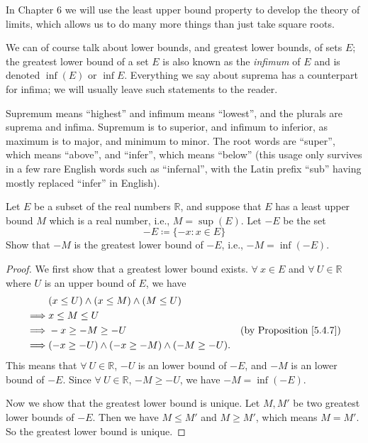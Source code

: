\begin{remark}\label{5.5.14}
In Chapter 6 we will use the least upper bound property to develop the theory of limits, which allows us to do many more things than just take square roots.
\end{remark}

\begin{remark}\label{5.5.15}
We can of course talk about lower bounds, and greatest lower bounds, of sets \(E\);
the greatest lower bound of a set \(E\) is also known as the \emph{infimum} of \(E\) and is denoted \(\inf(E)\) or \(\inf E\).
Everything we say about suprema has a counterpart for infima;
we will usually leave such statements to the reader.
\end{remark}

\begin{note}
Supremum means ``highest'' and infimum means ``lowest'', and the plurals are suprema and infima.
Supremum is to superior, and infimum to inferior, as maximum is to major, and minimum to minor.
The root words are ``super'', which means ``above'', and ``infer'', which means ``below''
(this usage only survives in a few rare English words such as ``infernal'', with the Latin prefix ``sub'' having mostly replaced ``infer'' in English).
\end{note}

\exercisesection

\begin{exercise}\label{ex 5.5.1}
Let \(E\) be a subset of the real numbers \(\mathds{R}\), and suppose that \(E\) has a least upper bound \(M\) which is a real number, i.e., \(M = \sup(E)\).
Let \(-E\) be the set
\[
    -E \coloneqq \{-x : x \in E\}
\]
Show that \(-M\) is the greatest lower bound of \(-E\), i.e., \(-M = \inf(-E)\).
\end{exercise}

\begin{proof}
We first show that a greatest lower bound exists.
\(\forall\ x \in E\) and \(\forall\ U \in \mathds{R}\) where \(U\) is an upper bound of \(E\), we have
\begin{align*}
& (x \leq U) \land (x \leq M) \land (M \leq U) \\
\implies & x \leq M \leq U \\
\implies & -x \geq -M \geq -U & \text{(by Proposition \ref{5.4.7})} \\
\implies & (-x \geq -U) \land (-x \geq -M) \land (-M \geq -U).
\end{align*}
This means that \(\forall\ U \in \mathds{R}\), \(-U\) is an lower bound of \(-E\), and \(-M\) is an lower bound of \(-E\).
Since \(\forall\ U \in \mathds{R}\), \(-M \geq -U\), we have \(-M = \inf(-E)\).

Now we show that the greatest lower bound is unique.
Let \(M, M'\) be two greatest lower bounds of \(-E\).
Then we have \(M \leq M'\) and \(M \geq M'\), which means \(M = M'\).
So the greatest lower bound is unique.
\end{proof}

